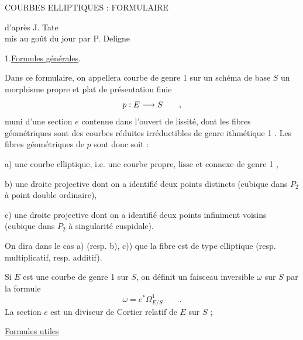 
\begin{center}
COURBES ELLIPTIQUES : FORMULAIRE

d'après J. Tate\\
mis au goût du jour par P. Deligne
\end{center}

1.\qquad \uline{Formules générales}.

Dans ce formulaire, on appellera courbe de genre 1 sur un schéma de base $S$ un morphisme propre et plat de présentation finie
\[
p : E \longrightarrow S \qquad ,
\]
muni d'une section $e$ contenue dans l'ouvert de lissité, dont les fibres géométriques sont des courbes réduites irréductibles de genre ithmétique 1 . Les fibres géométriques de $p$ sont donc soit :

a) une courbe elliptique, i.e. une courbe propre, lisse et connexe de genre 1 ,

b) une droite projective dont on a identifié deux points distincts (cubique dans $P_2$ à point double ordinaire),

c) une droite projective dont on a identifié deux points infiniment voisins (cubique dans $P_2$ à singularité cuspidale).

On dira dans le cas a) (resp. b), c)) que la fibre est de type elliptique (resp. multiplicatif, resp. additif).

Si $E$ est une courbe de genre 1 sur $S$, on définit un faisceau inversible $\omega$ sur $S$ par la formule
\[
\omega=e^*\Omega^1_{E/S}\qquad .
\]
La section $e$ est un diviseur de Cortier relatif de $E$ sur $S$ ;

\uline{Formules utiles}

